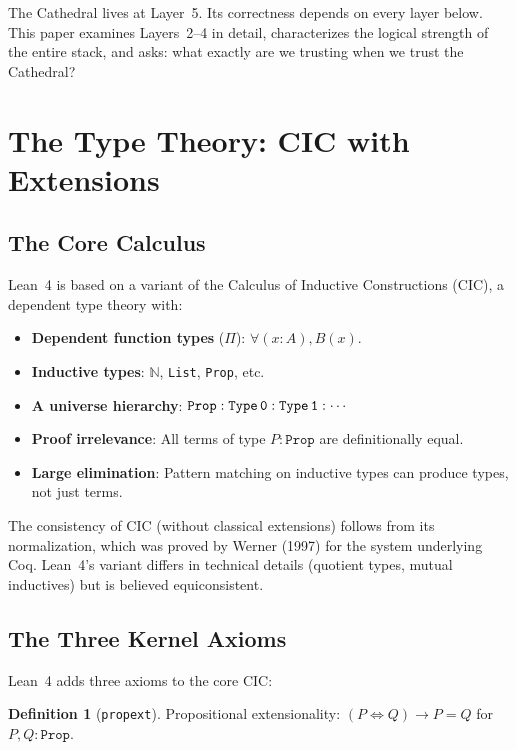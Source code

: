\documentclass[11pt,a4paper]{article}
\theoremstyle{plain}
\theoremstyle{definition}
\newtheorem{definition}[theorem]{Definition}
\newcommand{\lean}[1]{\texttt{#1}}
\newcommand{\NN}{\mathbb{N}}
\begin{document}
The Cathedral lives at Layer~5. Its correctness depends on every
layer below. This paper examines Layers~2--4 in detail, characterizes
the logical strength of the entire stack, and asks: what exactly
are we trusting when we trust the Cathedral?

\section{The Type Theory: CIC with Extensions}
\label{sec:cic}

\subsection{The Core Calculus}

Lean~4 is based on a variant of the Calculus of Inductive Constructions
(CIC), a dependent type theory with:

\begin{itemize}
  \item \textbf{Dependent function types} ($\Pi$): $\forall (x : A), B(x)$.
  \item \textbf{Inductive types}: $\NN$, \lean{List}, \lean{Prop}, etc.
  \item \textbf{A universe hierarchy}: $\lean{Prop} : \lean{Type\,0} :
    \lean{Type\,1} : \cdots$
  \item \textbf{Proof irrelevance}: All terms of type $P : \lean{Prop}$
    are definitionally equal.
  \item \textbf{Large elimination}: Pattern matching on inductive types
    can produce types, not just terms.
\end{itemize}

The consistency of CIC (without classical extensions) follows from
its normalization, which was proved by Werner (1997) for the system
underlying Coq. Lean~4's variant differs in technical details
(quotient types, mutual inductives) but is believed equiconsistent.

\subsection{The Three Kernel Axioms}

Lean~4 adds three axioms to the core CIC:

\begin{definition}[\lean{propext}]
Propositional extensionality: $(P \iff Q) \to P = Q$ for
$P, Q : \lean{Prop}$.
\end{definition}
\end{document}
